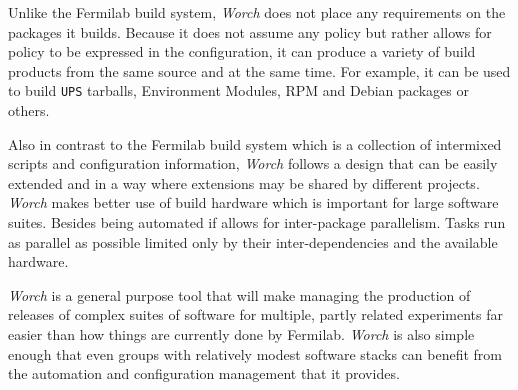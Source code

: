 \documentclass[usletter]{article}
\newcommand{\code}[1]{\texttt{#1}}
\newcommand{\worch}{\textit{Worch}\xspace}
\newcommand{\ups}{\code{UPS}\xspace}
\begin{document}
Unlike the Fermilab build system, \worch does not place any
requirements on the packages it builds.  Because it does not assume
any policy but rather allows for policy to be expressed in the
configuration, it can produce a variety of build products from the
same source and at the same time.  For example, it can be used to
build \ups tarballs, Environment Modules, RPM and Debian packages or
others.


Also in contrast to the Fermilab build system which is a  collection
of intermixed scripts and configuration information, \worch follows a
design that can be easily extended and in a way where extensions may
be shared by different projects.  \worch makes better use of build
hardware which is important for large software suites.  Besides being
automated if allows for inter-package parallelism.  Tasks run as
parallel as possible limited only by their inter-dependencies and the
available hardware.


\worch is a general purpose tool that will make managing the production
of releases of complex suites of software for multiple, partly related
experiments far easier than how things are currently done by Fermilab.
\worch is also simple enough that even groups with relatively modest
software stacks can benefit from the automation and configuration
management that it provides.
\end{document}
